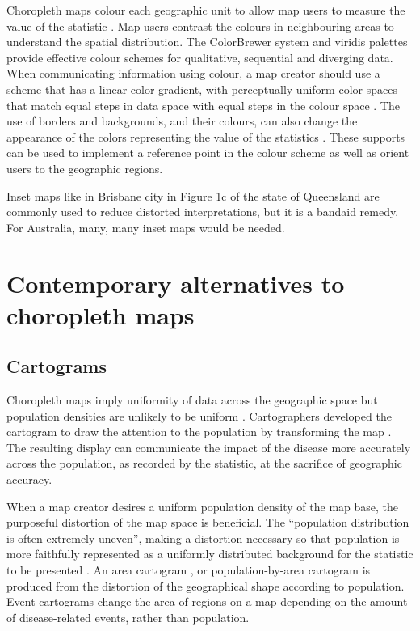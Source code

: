 \documentclass{monashthesis}
\begin{document}
Choropleth maps colour each geographic unit to allow map users to measure the value of the statistic \autocite{EI}. Map users contrast the colours in neighbouring areas to understand the spatial distribution. The ColorBrewer system \autocite{CB} and viridis \autocite{viridis} palettes provide effective colour schemes for qualitative, sequential and diverging data. When communicating information using colour, a map creator should use a scheme that has a linear color gradient, with perceptually uniform color spaces that match equal steps in data space with equal steps in the colour space \autocite{PUCS}.
The use of borders and backgrounds, and their colours, can also change the appearance of the colors representing the value of the statistics \autocite{CB}. These supports can be used to implement a reference point in the colour scheme as well as orient users to the geographic regions.

Inset maps like in Brisbane city in Figure 1c of the state of Queensland are commonly used to reduce distorted interpretations, but it is a bandaid remedy. For Australia, many, many inset maps would be needed.

\hypertarget{ch:alternatives}{%
\section{Contemporary alternatives to choropleth maps}\label{ch:alternatives}}

\hypertarget{cartograms}{%
\subsection{Cartograms}\label{cartograms}}

Choropleth maps imply uniformity of data across the geographic space but population densities are unlikely to be uniform \autocite{BCM}. Cartographers developed the cartogram to draw the attention to the population by transforming the map \autocite{ACCAC}. The resulting display can communicate the impact of the disease more accurately across the population, as recorded by the statistic, at the sacrifice of geographic accuracy.

When a map creator desires a uniform population density of the map base, the purposeful distortion of the map space is beneficial. The ``population distribution is often extremely uneven'', making a distortion necessary so that population is more faithfully represented as a uniformly distributed background for the statistic to be presented \autocite{ACTUC} \autocite{CTTMB} \autocite{GOINO}. An area cartogram \autocite{NAC}, or population-by-area cartogram \autocite{TAAM} is produced from the distortion of the geographical shape according to population. Event cartograms \autocite{VSSDCUC} change the area of regions on a map depending on the amount of disease-related events, rather than population.
\end{document}
